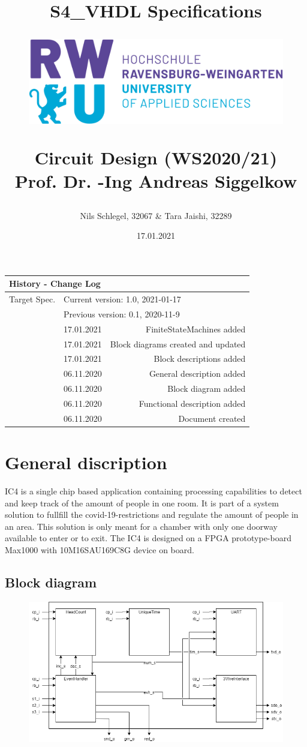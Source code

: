 \documentclass[12pt,a4 paper] {report}
\title{
	\textbf{S4\_VHDL Specifications} \\
	\begin{figure}[h]
		\centering
		\includegraphics[scale=0.4]{../png/rwu.png}
	\end{figure}
	Circuit Design (WS2020/21) \\
	Prof. Dr. -Ing Andreas Siggelkow \\
}
\author{Nils Schlegel, 32067 \& Tara Jaishi, 32289}
\date{17.01.2021}
\begin{document}
\maketitle

\newpage

\begin{center}
	\begin{tabular}{llr}
		\multicolumn{3}{l}{\textbf{History - Change Log}} \\
		\hline
		Target Spec. & \multicolumn{2}{l}{Current version: 1.0, 2021-01-17} \\
		& \multicolumn{2}{l}{Previous version: 0.1, 2020-11-9} \\
		\hline
		&	17.01.2021 & FiniteStateMachines added \\
		&	17.01.2021 & Block diagrams created and updated \\
		&	17.01.2021 & Block descriptions added \\
		&	06.11.2020 & General description added \\
		&	06.11.2020 & Block diagram added \\
		&	06.11.2020 & Functional description added \\
		&	06.11.2020 & Document created
	\end{tabular}
\end{center}

\newpage

\tableofcontents

\newpage

\chapter{General discription}
IC4 is a single chip based application containing processing capabilities to detect and keep track of the amount of people in one room. It is part of a system solution to fullfill the covid-19-restrictions and regulate the amount of people in an area. This solution is only meant for a chamber with only one doorway available to enter or to exit.\newline
The IC4 is designed on a FPGA prototype-board Max1000 with 10M16SAU169C8G device on board.
\newpage	
\section{Block diagram}
\begin{figure}[h]
	\centering	
	\includegraphics[scale=0.6]{../png/top.png}
\end{figure}
\end{document}
